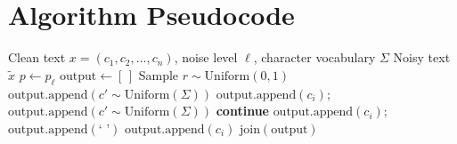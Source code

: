 \documentclass[12pt,a4paper]{report}
\begin{document}
\appendix
\chapter{Algorithm Pseudocode}

\begin{algorithm}[H]
\caption{HindiMix-Noisy Character-Level Noise Injection}
\label{alg:noise}
\begin{algorithmic}[1]
\Require Clean text $x = (c_1, c_2, \ldots, c_n)$, noise level $\ell$, character vocabulary $\Sigma$
\Ensure Noisy text $\tilde{x}$
\State $p \leftarrow p_\ell$ 
\State $\text{output} \leftarrow [\,]$
  \State Sample $r \sim \mathrm{Uniform}(0,1)$
   
    \State $\text{output.append}\!\left(c' \sim \mathrm{Uniform}(\Sigma)\right)$
   
    \State $\text{output.append}(c_i)$; \; $\text{output.append}\!\left(c' \sim \mathrm{Uniform}(\Sigma)\right)$
   
    \State \textbf{continue} 
   
    \State $\text{output.append}(c_i)$; \; $\text{output.append}(\texttt{` '})$
  \Else {}
    \State $\text{output.append}(c_i)$
  \EndIf
\EndFor
\State \Return $\mathrm{join}(\text{output})$
\end{algorithmic}
\end{algorithm}
\end{document}
